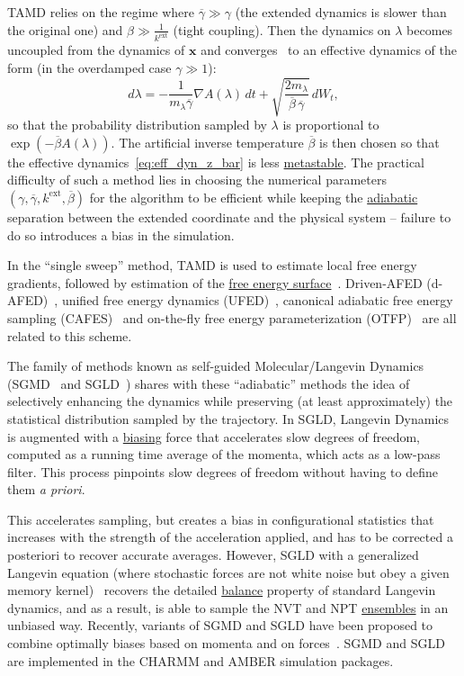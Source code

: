 \documentclass[9pt,review]{livecoms}
\newcommand{\vx}{\mathbf{x}}
\begin{document}
TAMD relies on the regime where $\overline{\gamma} \gg \gamma$ (the extended dynamics is slower than the original one) and $\beta \gg \frac{1}{k^\mathrm{ext}}$ (tight coupling). Then the dynamics on $\lambda$ becomes uncoupled from the dynamics of $\vx$ and converges~\cite{MV06} to an effective dynamics of the form (in the overdamped case $\gamma \gg 1$):
\begin{equation}\label{eq:eff_dyn_z_bar}
d\lambda = - \frac{1}{ m_\lambda \overline{\gamma}} \nabla A(\lambda) \, dt + \sqrt{ \frac{2  m_\lambda}{\overline{\beta} \, \overline{\gamma}}} \, dW_t,
\end{equation}
so that the probability distribution sampled by $\lambda$ is proportional to $\exp(- \overline{\beta} A(\lambda))$. The artificial inverse temperature $\overline{\beta}$ is then chosen so that the effective dynamics~\eqref{eq:eff_dyn_z_bar} is less \hyperlink{ref:metastab} {metastable}.
The practical difficulty of such a method lies in  choosing the numerical parameters $(\gamma,\overline{\gamma},k^\mathrm{ext},\overline{\beta})$ for the algorithm to be efficient while keeping the \hyperlink{ref:AdiabaticDyn} {adiabatic} separation between the extended coordinate and the physical system -- failure to do so introduces a bias in the simulation.

In the ``single sweep'' method, TAMD is used to estimate local free energy gradients, followed by estimation of the \hyperlink{ref:FES} {free energy surface}~\cite{Maragliano2008}.
Driven-AFED (d-AFED)~\cite{doi:10.1021/jp805039u}, unified free energy dynamics (UFED)~\cite{doi:10.1063/1.4733389}, canonical adiabatic free energy sampling (CAFES)~\cite{doi:10.1021/jp013346k} and on-the-fly free energy parameterization (OTFP)~\cite{ABRAMS2012114} are all related to this scheme.

The family of methods known as self-guided Molecular/Langevin Dynamics (SGMD~\cite{Wu1999SGMD} and SGLD~\cite{Wu2003_SGLD}) shares with these ``adiabatic'' methods the idea of selectively enhancing the dynamics while preserving (at least approximately) the statistical distribution sampled by the trajectory.
In SGLD, Langevin Dynamics is augmented with a \hyperlink{ref:biasingE} {biasing} force that accelerates slow degrees of freedom, computed as a running time average of the momenta, which acts as a low-pass filter. This process pinpoints slow degrees of freedom without having to define them \textit{a priori}.

This accelerates sampling, but creates a bias in configurational statistics that increases with the strength of the acceleration applied, and has to be corrected a posteriori to recover accurate averages.
However, SGLD with a generalized Langevin equation (where stochastic forces are not white noise but obey a given memory kernel)~\cite{Wu2015_SGLD-GLE} recovers the detailed \hyperlink{ref:Balance} {balance} property of standard Langevin dynamics, and as a result, is able to sample the NVT and NPT \hyperlink{ref:Ensemble} {ensembles} in an unbiased way.
Recently, variants of SGMD and SGLD have been proposed to combine optimally biases based on momenta and on forces~\cite{Wu2020_SGLDg}.
SGMD and SGLD are implemented in the CHARMM and AMBER simulation packages.
\end{document}
